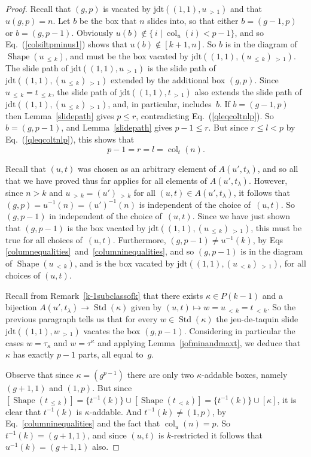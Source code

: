\documentclass[ALCO,ThmDefs,Unicode,epreuves]{cedram}
\DeclareMathOperator{\col}{col}
\newcommand{\lessthan}[2]{#1\,{_{<\,#2}}}
\newcommand{\morethan}[2]{#1\,{_{>\,#2}}}
\newcommand{\Lessthan}[2]{#1\,{_{\leqslant\,#2}}}
\newcommand{\jdt}{\mathrm{jdt}}
\DeclareMathOperator{\STD}{Std}
\DeclareMathOperator{\shape}{Shape}
\begin{document}
\begin{proof}
Recall that $(g,p)$ is vacated by $\jdt((1,1),\morethan u1)$ and that $u(g,p)=n$.
Let $b$ be the box that $n$ slides into, so that either $b=(g-1,p)$ or
$b=(g,p-1)$. Obviously $u(b)\notin\{\,i\mid\col_u(i)<p-1\}$, and so
Eq.~(\ref{colsiltpminus1}) shows that $u(b)\notin[k+1,n]$. So $b$
is in the diagram of $\shape(\Lessthan uk)$, and must be the box vacated by
$\jdt((1,1),\morethan{(\Lessthan uk)}1)$. The slide path of
$\jdt((1,1),\morethan u1)$ is the slide path of
$\jdt((1,1),\morethan{(\Lessthan uk)}1)$ extended by the additional box $(g,p)$.
Since $\Lessthan uk=\Lessthan tk$, the slide path of $\jdt((1,1),\morethan t1)$
also extends the slide path of $\jdt((1,1),\morethan{(\Lessthan uk)}1)$, and,
in particular, includes~$b$. If $b=(g-1,p)$ then Lemma~\ref{slidepath}
gives $p\leqslant r$, contradicting Eq.~(\ref{qleqcoltnlp}). So $b=(g,p-1)$,
and Lemma~\ref{slidepath} gives $p-1\leqslant r$.
But since $r\leqslant l<p$ by Eq.~(\ref{qleqcoltnlp}),
this shows that
\begin{equation}\label{columnequalities}
p-1=r=l=\col_t(n).
\end{equation}

Recall that $(u,t)$ was chosen as an arbitrary element of $A(u',t_\lambda)$, and so
all that we have proved thus far applies for all elements of $A(u',t_\lambda)$.
However, since $n>k$ and $\morethan uk=\morethan{(u')}k$ for all
$(u,t)\in A(u',t_\lambda)$, it follows that $(g,p)=u^{-1}(n)=(u')^{-1}(n)$
is independent of the choice of~$(u,t)$. So $(g,p-1)$ in independent of the
choice of~$(u,t)$. Since we have just shown that $(g,p-1)$ is the box vacated
by $\jdt((1,1),\morethan{(\Lessthan uk)}1)$, this must be true for all choices
of~$(u,t)$. Furthermore, $(g,p-1)\ne u^{-1}(k)$, by Eqs
\eqref{columnequalities}~and~\eqref{columninequalities}, and so $(g,p-1)$ is in the
diagram of $\shape(\lessthan uk)$, and is the box vacated by
$\jdt((1,1),\morethan{(\lessthan uk)}1)$, for all choices of $(u,t)$.

Recall from Remark~\ref{k-1subclassofk} that there exists $\kappa\in P(k-1)$
and a bijection $A(u',t_\lambda)\to\STD(\kappa)$ given by
$(u,t)\mapsto w=\lessthan uk=\lessthan tk$. So the previous paragraph
tells us that for every $w\in\STD(\kappa)$ the jeu-de-taquin slide
$\jdt((1,1),\morethan w1)$ vacates the box $(g,p-1)$. Considering in particular
the cases $w=\tau_\kappa$ and $w=\tau^\kappa$ and applying Lemma~\ref{jofminandmaxt},
we deduce that $\kappa$ has exactly $p-1$ parts, all equal to~$g$.

Observe that since $\kappa=(g^{p-1})$ there are only two $\kappa$-addable boxes,
namely $(g+1,1)$ and $(1,p)$. But since
$[\shape(\Lessthan tk)]=\{t^{-1}(k)\}\cup[\shape(\lessthan tk)]=\{t^{-1}(k)\}\cup[\kappa]$,
it is clear that $t^{-1}(k)$ is $\kappa$-addable. And $t^{-1}(k)\ne(1,p)$, by
Eq.~\eqref{columninequalities} and the fact that $\col_u(n)=p$. So $t^{-1}(k)=(g+1,1)$,
and since $(u,t)$ is $k$-restricted it follows that $u^{-1}(k)=(g+1,1)$ also.


\end{proof}
\end{document}
